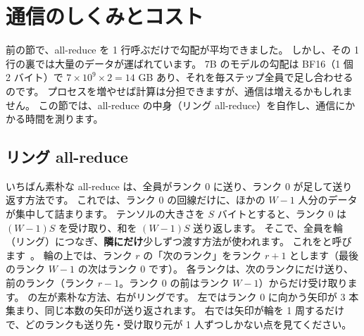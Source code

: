 \section{通信のしくみとコスト}\label{sec:dist-comm}

前の節で、all-reduce を 1 行呼ぶだけで勾配が平均できました。
しかし、その 1 行の裏では大量のデータが運ばれています。
7B のモデルの勾配は BF16（1 個 2 バイト）で $7\times10^{9}\times2=14$ GB あり、それを毎ステップ全員で足し合わせるのです。
プロセスを増やせば計算は分担できますが、通信は増えるかもしれません。
この節では、all-reduce の中身（リング all-reduce）を自作し、通信にかかる時間を測ります。

\subsection*{リング all-reduce}

いちばん素朴な all-reduce は、全員がランク 0 に送り、ランク 0 が足して送り返す方法です。
これでは、ランク 0 の回線だけに、ほかの $W-1$ 人分のデータが集中して詰まります。
テンソルの大きさを $S$ バイトとすると、ランク 0 は $(W-1)S$ を受け取り、和を $(W-1)S$ 送り返します。
そこで、全員を輪（リング）につなぎ、\textbf{隣にだけ}少しずつ渡す方法が使われます。
これをと呼びます~\cite{sergeev2018horovod}。
輪の上では、ランク $r$ の「次のランク」をランク $r+1$ とします（最後のランク $W-1$ の次はランク 0 です）。
各ランクは、次のランクにだけ送り、前のランク（ランク $r-1$。ランク 0 の前はランク $W-1$）からだけ受け取ります。
の左が素朴な方法、右がリングです。
左ではランク 0 に向かう矢印が 3 本集まり、同じ本数の矢印が送り返されます。
右では矢印が輪を 1 周するだけで、どのランクも送り先・受け取り元が 1 人ずつしかない点を見てください。

